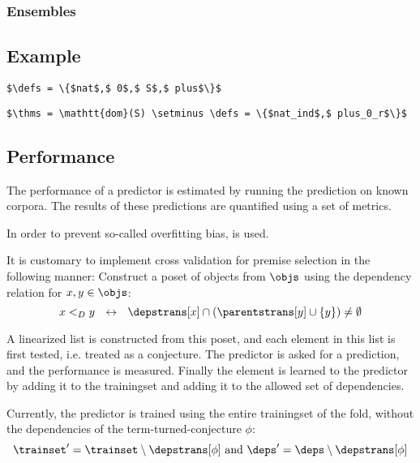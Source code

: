 \subsubsection{Ensembles}

\subsection{Example}

\begin{lstlisting}[language=Coq, mathescape, frame=none]
$\defs = \{$nat$,$ 0$,$ S$,$ plus$\}$
\end{lstlisting}

\begin{lstlisting}[language=Coq, mathescape, frame=none]
$\thms = \mathtt{dom}(S) \setminus \defs = \{$nat_ind$,$ plus_0_r$\}$
\end{lstlisting}

\subsection{Performance}
The performance of a predictor is estimated by running the prediction on known corpora.
The results of these predictions are quantified using a set of metrics.

In order to prevent so-called overfitting bias, \crossvalidation is used.


It is customary to implement cross validation for premise selection in the following manner:
Construct a poset of objects from $\objs$ using the dependency relation for $x, y \in \objs$:
\[
	x <_D y ~~\leftrightarrow~~ \depstrans[x] \cap (\parentstrans[y] \cup \{y\}) \neq \emptyset
\]

A linearized list is constructed from this poset, and each element in this list is first tested, i.e. treated as a conjecture.
The predictor is asked for a prediction, and the performance is measured.
Finally the element is learned to the predictor by adding it to the trainingset and adding it to the allowed set of dependencies.

Currently, the predictor is trained using the entire trainingset of the fold, without the dependencies of the term-turned-conjecture $\phi$:
\[
	\trainset' = \trainset \setminus \depstrans[\phi] ~\text{and}~ \deps' = \deps \setminus \depstrans[\phi]
\]

